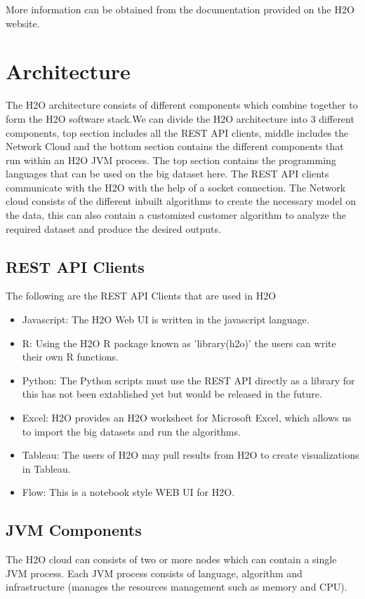 \documentclass[9pt,twocolumn,twoside]{../../styles/osajnl}
\begin{document}
More information can be obtained from the documentation provided on
the H2O website\cite{www-h2o-requirements}.

\section{Architecture}

The H2O architecture consists of different components which combine
together to form the H2O software stack.\newline We can divide the H2O
architecture into 3 different components, top section includes all the
REST API clients, middle includes the Network Cloud and the bottom
section contains the different components that run within an H2O JVM
process\cite{www-h2o-architecture}. The top section contains the
programming languages that can be used on the big dataset here. The
REST API clients communicate with the H2O with the help of a socket
connection\cite{www-h2o-architecture}. The Network cloud consists of
the different inbuilt algorithms to create the necessary model on the
data, this can also contain a customized customer algorithm to analyze
the required dataset and produce the desired outputs.

\subsection{REST API Clients}
The following are the REST API Clients that are used in H2O

\begin{itemize}
  \item Javascript: The H2O Web UI is written in the javascript language.
\item R: Using the H2O R package known as 'library(h2o)' the users can write their own R functions.
\item Python: The Python scripts must use the REST API directly as a library for this has not been extablished yet but would be released in the future.
\item Excel: H2O provides an H2O worksheet for Microsoft Excel, which allows us to import the big datasets and run the algorithms.
\item Tableau: The users of H2O may pull results from H2O to create visualizations in Tableau.
\item Flow: This is a notebook style WEB UI for H2O\cite{www-h2o-architecture}.
\end{itemize}
\subsection{JVM Components}
The H2O cloud can consists of two or more nodes
which can contain a single JVM process. Each JVM process consists of
language, algorithm and infrastructure (manages the resources
management such as memory and CPU)\cite{www-h2o-architecture}.
\end{document}
